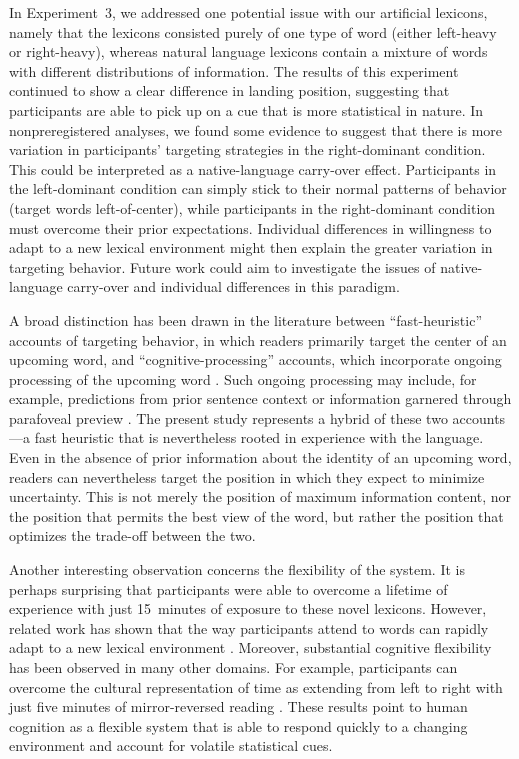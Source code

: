 \documentclass[doc,biblatex,floatsintext]{apa7}
\begin{document}
In Experiment~3, we addressed one potential issue with our artificial lexicons, namely that the lexicons consisted purely of one type of word (either left-heavy or right-heavy), whereas natural language lexicons contain a mixture of words with different distributions of information. The results of this experiment continued to show a clear difference in landing position, suggesting that participants are able to pick up on a cue that is more statistical in nature. In nonpreregistered analyses, we found some evidence to suggest that there is more variation in participants' targeting strategies in the right-dominant condition. This could be interpreted as a native-language carry-over effect. Participants in the left-dominant condition can simply stick to their normal patterns of behavior (target words left-of-center), while participants in the right-dominant condition must overcome their prior expectations. Individual differences in willingness to adapt to a new lexical environment might then explain the greater variation in targeting behavior. Future work could aim to investigate the issues of native-language carry-over and individual differences in this paradigm.

A broad distinction has been drawn in the literature between ``fast-heuristic'' accounts of targeting behavior, in which readers primarily target the center of an upcoming word, and ``cognitive-processing'' accounts, which incorporate ongoing processing of the upcoming word \parencite{Bicknell:2020}. Such ongoing processing may include, for example, predictions from prior sentence context \parencite{Balota:1985} or information garnered through parafoveal preview \parencite{Hyona:1989, Underwood:1990, Schotter:2011}. The present study represents a hybrid of these two accounts---a fast heuristic that is nevertheless rooted in experience with the language. Even in the absence of prior information about the identity of an upcoming word, readers can nevertheless target the position in which they expect to minimize uncertainty. This is not merely the position of maximum information content, nor the position that permits the best view of the word, but rather the position that optimizes the trade-off between the two.

Another interesting observation concerns the flexibility of the system. It is perhaps surprising that participants were able to overcome a lifetime of experience with just 15~minutes of exposure to these novel lexicons. However, related work has shown that the way participants attend to words can rapidly adapt to a new lexical environment \parencite{Ducrot:2002}. Moreover, substantial cognitive flexibility has been observed in many other domains. For example, participants can overcome the cultural representation of time as extending from left to right with just five minutes of mirror-reversed reading \parencite{Casasanto:2014}. These results point to human cognition as a flexible system that is able to respond quickly to a changing environment and account for volatile statistical cues.
\end{document}
